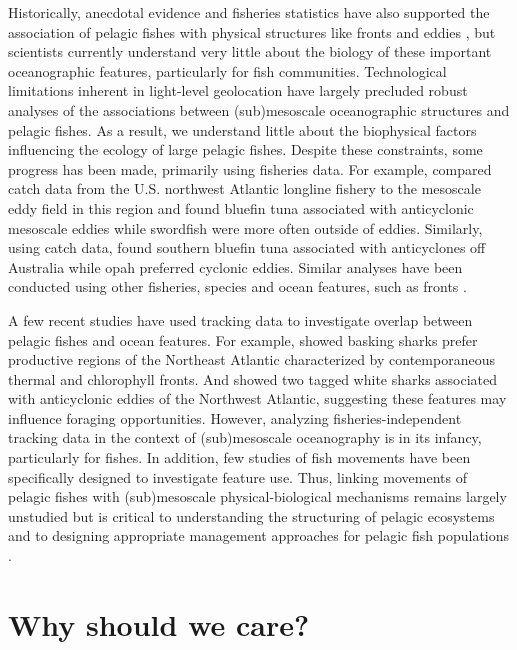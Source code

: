 Historically, anecdotal evidence and fisheries statistics have also supported the association of pelagic fishes with physical structures like fronts and eddies \citep[\eg][]{Hobday2014}, but scientists currently understand very little about the biology of these important oceanographic features, particularly for fish communities. Technological limitations inherent in light-level geolocation \citep{Braun2015a} have largely precluded robust analyses of the associations between (sub)mesoscale oceanographic structures and pelagic fishes. As a result, we understand little about the biophysical factors influencing the ecology of large pelagic fishes. Despite these constraints, some progress has been made, primarily using fisheries data. For example, \cite{Hsu2015} compared catch data from the U.S. northwest Atlantic longline fishery to the mesoscale eddy field in this region and found bluefin tuna associated with anticyclonic mesoscale eddies while swordfish were more often outside of eddies. Similarly, using catch data, \cite{Hobday2014} found southern bluefin tuna associated with anticyclones off Australia while opah preferred cyclonic eddies. Similar analyses have been conducted using other fisheries, species and ocean features, such as fronts \citep[\eg][]{Worm2005}.

A few recent studies have used tracking data to investigate overlap between pelagic fishes and ocean features. For example, \cite{Miller2015} showed basking sharks prefer productive regions of the Northeast Atlantic characterized by contemporaneous thermal and chlorophyll fronts. And \cite{Gaube2018} showed two tagged white sharks associated with anticyclonic eddies of the Northwest Atlantic, suggesting these features may influence foraging opportunities. However, analyzing fisheries-independent tracking data in the context of (sub)mesoscale oceanography is in its infancy, particularly for fishes. In addition, few studies of fish movements have been specifically designed to investigate feature use. Thus, linking movements of pelagic fishes with (sub)mesoscale physical-biological mechanisms remains largely unstudied but is critical to understanding the structuring of pelagic ecosystems and to designing appropriate management approaches for pelagic fish populations \citep{Hazen2018}.

\section{Why should we care?}
 
